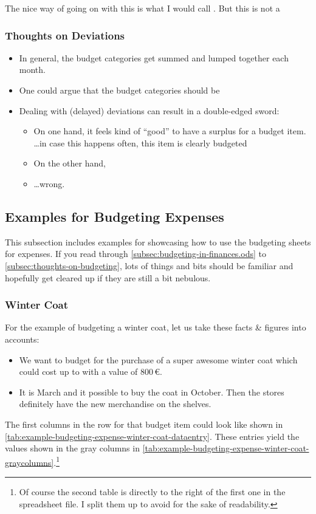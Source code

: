 The nice way of going on with this is what I would call .
But this is not a 

\subsubsection{Thoughts on Deviations}
\label{subsubsec:thoughts-deviations}

\begin{itemize}
	\item In general, the budget categories get summed and lumped together each month.
	\item One could argue that the budget categories should be 
	\item Dealing with (delayed) deviations can result in a double-edged sword:
	\begin{itemize}
		\item On one hand, it feels kind of ``good'' to have a surplus for a budget item.\\
		\ldots in case this happens often, this item is clearly budgeted
		\item On the other hand, 
		\item \ldots wrong.
	\end{itemize}
\end{itemize}

\subsection{Examples for Budgeting Expenses}
\label{subsec:examples-budgeting-expenses}

This subsection includes examples for showcasing how to use the budgeting sheets for expenses.
If you read through \autoref{subsec:budgeting-in-finances.ods} to \autoref{subsec:thoughts-on-budgeting}, lots of things and bits should be familiar and hopefully get cleared up if they are still a bit nebulous.

\subsubsection{Winter Coat}
\label{subsubsec:example-budgeting-expense-winter-coat}

For the example of budgeting a winter coat, let us take these facts \& figures into accounts:
\begin{itemize}
	\item We want to budget for the purchase of a super awesome winter coat which could cost up to with a value of 800\,€.
	\item It is March and it possible to buy the coat in October.
	Then the stores definitely have the new merchandise on the shelves.
\end{itemize}
The first columns in the row for that budget item could look like shown in \autoref{tab:example-budgeting-expense-winter-coat-dataentry}.
These entries yield the values shown in the gray columns in \autoref{tab:example-budgeting-expense-winter-coat-graycolumns}.\footnote{Of course the second table is directly to the right of the first one in the spreadsheet file.
I split them up to avoid for the sake of readability.}

